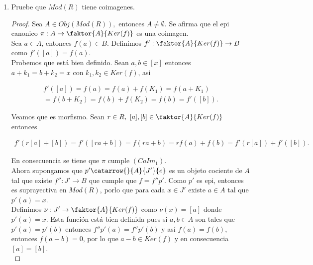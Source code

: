 \documentclass{article}
\begin{document}
\begin{enumerate}[label=\textbf{Ej \arabic*.}]
\begin{proof}
Para probar $(CoIm_2)$ supongamos que $p'\catarrow{}{A}{J'}{e}$ es un objeto cociente de $A$ tal que $exists f'':J'\to B$ tal que $f=f''p'$, pero
$p'$ es epi, y como $A=\emptyset$ entonces $J'=\emptyset$. Así, si definimos $u$ como la identidad en el vacio se tiene que $p=up'$.

\end{proof}

\item Pruebe que $Mod(R)$ tiene coimagenes.\\

\begin{proof}
Sea $A\in Obj(Mod(R)),$ entonces  $A\neq \emptyset$. Se afirma que el epi canonico $\pi:A\to \faktor{A}{Ker(f)}$ es una coimagen.\\

Sea $a\in A$, entonces $f(a)\in B$. Definimos $f': \faktor{A}{Ker(f)}\to B$ como $f'([a])=f(a)$.\\

Probemos que está bien definido. Sean $a,b\in [x]$ entonces \\$a+k_1=b+k_2=x$ con $k_1, k_2\in Ker(f)$, asi

\begin{align*}
f'([a])=f(a)=f(a)+f(K_1)=f(a+K_1)\\
=f(b+K_2)=f(b)+f(K_2)=f(b)=f'([b]).
\end{align*}

Veamos que es morfismo. Sean $r\in R,\,\,[a],[b]\in  \faktor{A}{Ker(f)}$ entonces 

\begin{align*}
f'(r[a]+[b])=f'([ra+b])=f(ra+b)=rf(a)+f(b)=f'(r[a])+f'([b]).
\end{align*}

En consecuencia se tiene que $\pi$ cumple $(CoIm_1)$.\\

Ahora supongamos que $p'\catarrow{}{A}{J'}{e}$ es un objeto cociente de $A$ tal que existe $f'':J'\to B$ que cumple que $f=f''p'$. Como $p'$ es
epi, entonces es suprayectiva en $Mod(R)$, porlo que para cada $x\in J'$ existe $a\in A$ tal que $p'(a)=x$.\\

Definimos $\nu:J'\to \faktor{A}{Ker(f)}$ como $\nu(x)=[a]$ donde $p'(a)=x$. Esta función está bien definida pues si $a,b\in A$ son tales que 
$p'(a)=p'(b)$ entonces $f''p'(a)=f''p'(b)$ y así $f(a)=f(b)$, entonces $f(a-b)=0$, por lo que $a-b\in Ker(f)$ y en consecuencia $[a]=[b]$.\\


\end{proof}
\end{enumerate}
\end{document}
